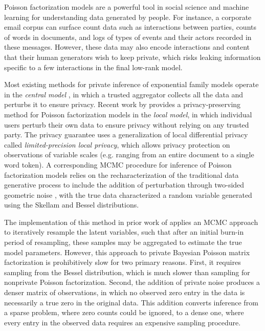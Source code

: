 \documentclass{article}
\begin{document}
  Poisson factorization models are a powerful tool in social science and machine
  learning for understanding data generated by people. For instance, a corporate
  email corpus can surface count data such as interactions between parties,
  counts of words in documents, and logs of types of events and their actors
  recorded in these messages. However, these data may also encode interactions
  and content that their human generators wish to keep private, which risks
  leaking information specific to a few interactions in the final low-rank
  model.
  
  Most existing methods for private inference of exponential family models
  operate in the \emph{central model}
  \citep{park2016private,bernstein2018differentially}, in which a trusted
  aggregator collects all the data and perturbs it to ensure privacy. Recent
  work by \cite{schein2018locally} provides a privacy-preserving method for
  Poisson factorization models in the \emph{local model}, in which individual
  users perturb their own data to ensure privacy without relying on any trusted
  party. The privacy guarantee uses a generalization of local differential
  privacy \citep{warner1965randomized} called \textit{limited-precision local
  privacy}, which allows privacy protection on observations of variable scales
  (e.g. ranging from an entire document to a single word token). A corresponding
  MCMC procedure for inference of Poisson factorization models relies on the
  recharacterization of the traditional data generative process to include the
  addition of perturbation through two-sided geometric noise
  \citep{ghosh2012universally}, with the true data characterized a random
  variable generated using the Skellam and Bessel distributions.
  
  The implementation of this method in prior work of \citep{schein2018locally}
  applies an MCMC approach to iteratively resample the latent variables, such
  that after an initial burn-in period of resampling, these samples may be
  aggregated to estimate the true model parameters. However, this approach to
  private Bayesian Poisson matrix factorization is prohibitively slow for two
  primary reasons. First, it requires sampling from the Bessel distribution,
  which is much slower than sampling for nonprivate Poisson factorization.
  Second, the addition of private noise produces a denser matrix of
  observations, in which no observed zero entry in the data is necessarily a
  true zero in the original data. This addition converts inference from a sparse
  problem, where zero counts could be ignored, to a dense one, where every entry
  in the observed data requires an expensive sampling procedure.
  
\end{document}

